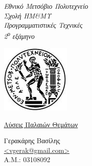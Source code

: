 \begin{titlepage}
\begin{center}

\noindent\begin{minipage}[b]{.55\textwidth}
\begin{Large}
\emph{Εθνικό Μετσόβιο Πολυτεχνείο\\
Σχολή ΗΜ\&ΜΥ\\
Προγραμματιστικές Τεχνικές\\
2\textsuperscript{ο} εξάμηνο}
\end{Large}
\end{minipage}%
\begin{minipage}[b]{.45\textwidth}
     \centering
     \includegraphics[scale=0.8]{title/ntua_logo}
\end{minipage}

\vspace{5cm}
\begin{huge}
\underline{Λύσεις Παλαιών Θεμάτων}
\end{huge}
\vfill

\begin{flushright}
\Large{Γερακάρης Βασίλης}\\
\large{\href{mailto:vgerak@gmail.com}{<vgerak@gmail.com>}}\\
\large{Α.Μ.: 03108092}\\
\end{flushright}
\vspace{1cm}

\end{center}
\end{titlepage}


